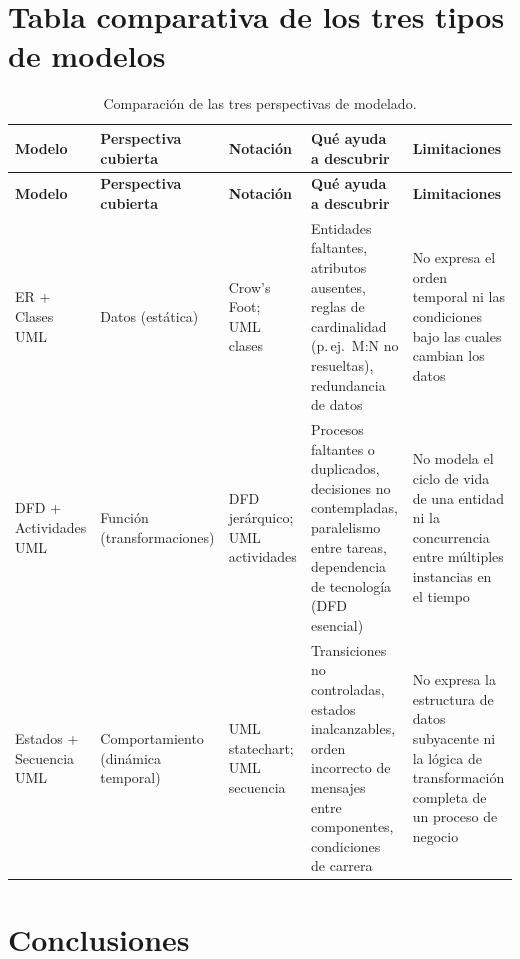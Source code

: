 \documentclass[11pt,a4paper]{report}
\begin{document}
\section{Tabla comparativa de los tres tipos de modelos}

{\footnotesize
\begin{longtable}{L{2.3cm}L{3.2cm}L{2.6cm}L{4.0cm}L{3.4cm}}
\caption{Comparaci\'on de las tres perspectivas de modelado.}\label{tab:comparativa}\\
\toprule
\textbf{Modelo} & \textbf{Perspectiva cubierta} & \textbf{Notaci\'on} & \textbf{Qu\'e ayuda a descubrir} & \textbf{Limitaciones} \\
\midrule
\endfirsthead
\toprule
\textbf{Modelo} & \textbf{Perspectiva cubierta} & \textbf{Notaci\'on} & \textbf{Qu\'e ayuda a descubrir} & \textbf{Limitaciones} \\
\midrule
\endhead
\bottomrule
\endfoot
ER + Clases UML & Datos (est\'atica) & Crow's Foot; UML clases & Entidades faltantes, atributos ausentes, reglas de cardinalidad (p.\,ej.\ M:N no resueltas), redundancia de datos & No expresa el orden temporal ni las condiciones bajo las cuales cambian los datos \\
DFD + Actividades UML & Funci\'on (transformaciones) & DFD jer\'arquico; UML actividades & Procesos faltantes o duplicados, decisiones no contempladas, paralelismo entre tareas, dependencia de tecnolog\'ia (DFD esencial) & No modela el ciclo de vida de una entidad ni la concurrencia entre m\'ultiples instancias en el tiempo \\
Estados + Secuencia UML & Comportamiento (din\'amica temporal) & UML statechart; UML secuencia & Transiciones no controladas, estados inalcanzables, orden incorrecto de mensajes entre componentes, condiciones de carrera & No expresa la estructura de datos subyacente ni la l\'ogica de transformaci\'on completa de un proceso de negocio \\
\end{longtable}
}

\section{Conclusiones}
\end{document}
